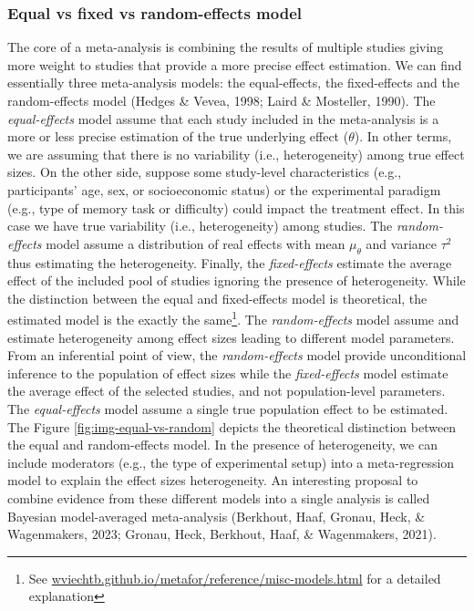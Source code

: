 \documentclass[
  man,floatsintext]{apa6}
\begin{document}
\hypertarget{equal-vs-fixed-vs-random-effects-model}{%
\subsubsection{Equal vs fixed vs random-effects model}\label{equal-vs-fixed-vs-random-effects-model}}

\color{red}

The core of a meta-analysis is combining the results of multiple studies giving more weight to studies that provide a more precise effect estimation. We can find essentially three meta-analysis models: the equal-effects, the fixed-effects and the random-effects model (Hedges \& Vevea, 1998; Laird \& Mosteller, 1990). The \emph{equal-effects} model assume that each study included in the meta-analysis is a more or less precise estimation of the true underlying effect (\(\theta\)). In other terms, we are assuming that there is no variability (i.e., heterogeneity) among true effect sizes. On the other side, suppose some study-level characteristics (e.g., participants' age, sex, or socioeconomic status) or the experimental paradigm (e.g., type of memory task or difficulty) could impact the treatment effect. In this case we have true variability (i.e., heterogeneity) among studies. The \emph{random-effects} model assume a distribution of real effects with mean \(\mu_{\theta}\) and variance \(\tau^{2}\) thus estimating the heterogeneity. Finally, the \emph{fixed-effects} estimate the average effect of the included pool of studies ignoring the presence of heterogeneity. While the distinction between the equal and fixed-effects model is theoretical, the estimated model is the exactly the same\footnote{See \href{https://wviechtb.github.io/metafor/reference/misc-models.html}{wviechtb.github.io/metafor/reference/misc-models.html} for a detailed explanation}. The \emph{random-effects} model assume and estimate heterogeneity among effect sizes leading to different model parameters. From an inferential point of view, the \emph{random-effects} model provide unconditional inference to the population of effect sizes while the \emph{fixed-effects} model estimate the average effect of the selected studies, and not population-level parameters. The \emph{equal-effects} model assume a single true population effect to be estimated. The Figure \ref{fig:img-equal-vs-random} depicts the theoretical distinction between the equal and random-effects model. In the presence of heterogeneity, we can include moderators (e.g., the type of experimental setup) into a meta-regression model to explain the effect sizes heterogeneity. \color{red} An interesting proposal to combine evidence from these different models into a single analysis is called Bayesian model-averaged meta-analysis (Berkhout, Haaf, Gronau, Heck, \& Wagenmakers, 2023; Gronau, Heck, Berkhout, Haaf, \& Wagenmakers, 2021). \color{black}
\end{document}
